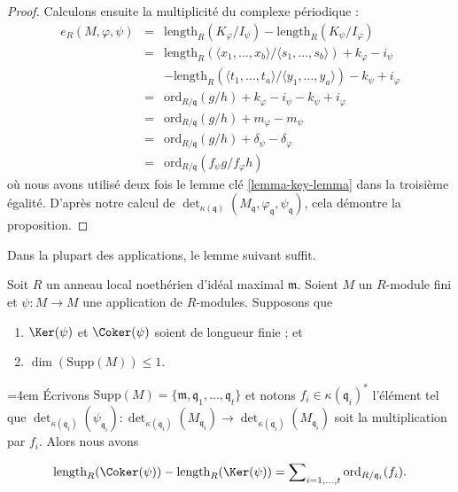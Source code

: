 \begin{proof}
\medskip\noindent
Calculons ensuite la multiplicité du complexe périodique :
\begin{eqnarray*}
e_R(M, \varphi, \psi) & = &
\text{length}_R(K_\varphi/I_\psi) - \text{length}_R(K_\psi/I_\varphi) \\
& = &
\text{length}_R(
\langle x_1, \ldots, x_b\rangle/
\langle s_1, \ldots, s_b\rangle)
+ k_\varphi - i_\psi \\
& & -
\text{length}_R(
\langle t_1, \ldots, t_a\rangle/
\langle y_1, \ldots, y_a\rangle)
- k_\psi + i_\varphi \\
& = &
\text{ord}_{R/\mathfrak q}(g/h) + k_\varphi - i_\psi - k_\psi + i_\varphi \\
& = &
\text{ord}_{R/\mathfrak q}(g/h) + m_\varphi - m_\psi \\
& = &
\text{ord}_{R/\mathfrak q}(g/h) + \delta_\psi - \delta_\varphi \\
& = &
\text{ord}_{R/\mathfrak q}(f_\psi g/f_\varphi h)
\end{eqnarray*}
où nous avons utilisé deux fois le lemme clé \ref{lemma-key-lemma} dans la troisième égalité.
D'après notre calcul de $\det_{\kappa(\mathfrak q)}
(M_{\mathfrak q}, \varphi_{\mathfrak q}, \psi_{\mathfrak q})$,
cela démontre la proposition.
\end{proof}

\noindent
Dans la plupart des applications, le lemme suivant suffit.

\begin{lemma}
\label{lemma-application-herbrand-quotient}
Soit $R$ un anneau local noethérien d'idéal maximal $\mathfrak m$.
Soient $M$ un $R$-module fini et $\psi : M \to M$ une
application de $R$-modules. Supposons que
\begin{enumerate}
\item $\Ker(\psi)$ et $\Coker(\psi)$ soient de longueur finie ; et
\item $\dim(\text{Supp}(M)) \leq 1$.
\end{enumerate}
{\emergencystretch=4em Écrivons
$\text{Supp}(M) = \{\mathfrak m, \mathfrak q_1, \ldots, \mathfrak q_t\}$
et notons $f_i \in \kappa(\mathfrak q_i)^*$ l'élément tel que
$\det_{\kappa(\mathfrak q_i)}(\psi_{\mathfrak q_i}) :
\det_{\kappa(\mathfrak q_i)}(M_{\mathfrak q_i})
\to \det_{\kappa(\mathfrak q_i)}(M_{\mathfrak q_i})$
soit la multiplication par $f_i$. Alors
nous avons\par}
$$
\text{length}_R(\Coker(\psi))
-
\text{length}_R(\Ker(\psi))
=
\sum\nolimits_{i = 1, \ldots, t}
\text{ord}_{R/\mathfrak q_i}(f_i).
$$
\end{lemma}

